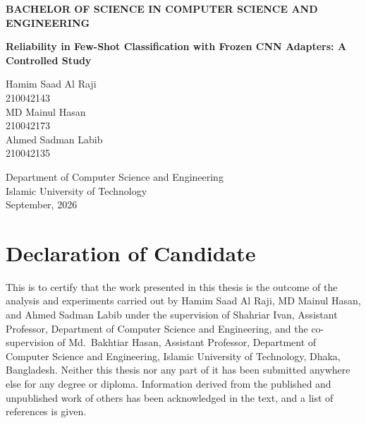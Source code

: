 \documentclass[12pt,a4paper,oneside]{report}
\begin{document}
\begin{titlepage}
\centering
{\large\bfseries BACHELOR OF SCIENCE IN COMPUTER SCIENCE AND ENGINEERING\par}
\vspace{3cm}
{\LARGE\bfseries Reliability in Few-Shot Classification with Frozen CNN Adapters: A Controlled Study\par}
\vspace{3cm}
{\large
Hamim Saad Al Raji\\ 210042143\\[6pt]
MD Mainul Hasan\\ 210042173\\[6pt]
Ahmed Sadman Labib\\ 210042135\par}
\vfill
{\large Department of Computer Science and Engineering\\
Islamic University of Technology\\
September, 2026\par}
\end{titlepage}

\setcounter{page}{2}

\chapter*{Declaration of Candidate}
This is to certify that the work presented in this thesis is the outcome of the analysis and
experiments carried out by Hamim Saad Al Raji, MD Mainul Hasan, and Ahmed Sadman Labib under the
supervision of Shahriar Ivan, Assistant Professor, Department of Computer Science and Engineering,
and the co-supervision of Md.\ Bakhtiar Hasan, Assistant Professor, Department of Computer Science
and Engineering, Islamic University of Technology, Dhaka, Bangladesh. Neither this thesis nor any
part of it has been submitted anywhere else for any degree or diploma. Information derived from the
published and unpublished work of others has been acknowledged in the text, and a list of references
is given.
\end{document}
